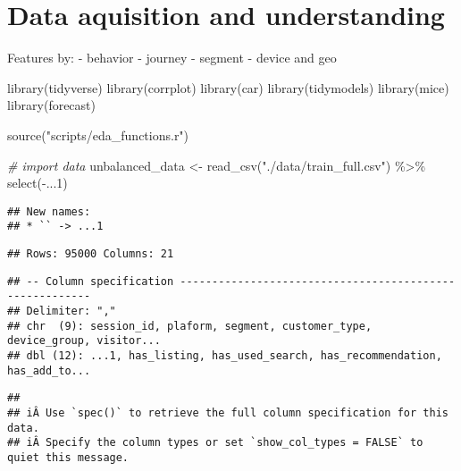 \documentclass[
]{book}
\newenvironment{Shaded}{\begin{snugshade}}{\end{snugshade}}
\newcommand{\CommentTok}[1]{\textcolor[rgb]{0.56,0.35,0.01}{\textit{#1}}}
\newcommand{\DecValTok}[1]{\textcolor[rgb]{0.00,0.00,0.81}{#1}}
\newcommand{\FunctionTok}[1]{\textcolor[rgb]{0.00,0.00,0.00}{#1}}
\newcommand{\NormalTok}[1]{#1}
\newcommand{\OtherTok}[1]{\textcolor[rgb]{0.56,0.35,0.01}{#1}}
\newcommand{\SpecialCharTok}[1]{\textcolor[rgb]{0.00,0.00,0.00}{#1}}
\newcommand{\StringTok}[1]{\textcolor[rgb]{0.31,0.60,0.02}{#1}}
\begin{document}
\hypertarget{data-aquisition-and-understanding}{%
\chapter{Data aquisition and understanding}\label{data-aquisition-and-understanding}}

Features by:
- behavior
- journey
- segment
- device and geo

\begin{Shaded}
\begin{Highlighting}[]
\FunctionTok{library}\NormalTok{(tidyverse)}
\FunctionTok{library}\NormalTok{(corrplot)}
\FunctionTok{library}\NormalTok{(car)}
\FunctionTok{library}\NormalTok{(tidymodels)}
\FunctionTok{library}\NormalTok{(mice)}
\FunctionTok{library}\NormalTok{(forecast)}

\FunctionTok{source}\NormalTok{(}\StringTok{"scripts/eda\_functions.r"}\NormalTok{)}
\end{Highlighting}
\end{Shaded}

\begin{Shaded}
\begin{Highlighting}[]
\CommentTok{\# import data}
\NormalTok{unbalanced\_data }\OtherTok{\textless{}{-}} \FunctionTok{read\_csv}\NormalTok{(}\StringTok{"./data/train\_full.csv"}\NormalTok{) }\SpecialCharTok{\%\textgreater{}\%} \FunctionTok{select}\NormalTok{(}\SpecialCharTok{{-}}\NormalTok{...}\DecValTok{1}\NormalTok{)}
\end{Highlighting}
\end{Shaded}

\begin{verbatim}
## New names:
## * `` -> ...1
\end{verbatim}

\begin{verbatim}
## Rows: 95000 Columns: 21
\end{verbatim}

\begin{verbatim}
## -- Column specification --------------------------------------------------------
## Delimiter: ","
## chr  (9): session_id, plaform, segment, customer_type, device_group, visitor...
## dbl (12): ...1, has_listing, has_used_search, has_recommendation, has_add_to...
\end{verbatim}

\begin{verbatim}
## 
## iÂ Use `spec()` to retrieve the full column specification for this data.
## iÂ Specify the column types or set `show_col_types = FALSE` to quiet this message.
\end{verbatim}
\end{document}
